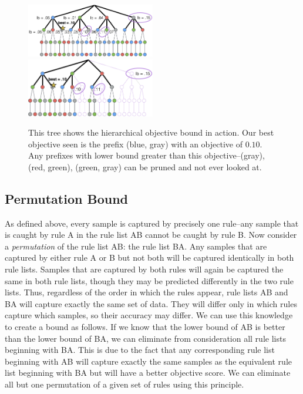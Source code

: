\documentclass[]{report}
\theoremstyle{definition}
\begin{document}
\begin{figure}
\includegraphics[width=0.5\textwidth]{figs/ela_branch-and-bound-tree.png}
\includegraphics[width=0.5\textwidth]{figs/ela_branch-and-bound-tree-pruned.png}
\caption[Objective bound]{This tree shows the hierarchical objective bound in action. Our best objective seen is the prefix (blue, gray) with an objective of $0.10$. Any prefixes with lower bound greater than this objective--(gray), (red, green), (green, gray) can be pruned and not ever looked at.
\label{fig:objective-bound}}
\end{figure}

\subsection{Permutation Bound}

As defined above, every sample is captured by precisely one rule--any sample that is caught by rule A in the rule list AB cannot be caught by rule B. 
Now consider a \textit{permutation} of the rule list AB: the rule list BA.
Any samples that are captured by either rule A or B but not both will be captured identically in both rule lists.
Samples that are captured by both rules will again be captured the same in both rule lists, though they may be predicted differently in the two rule lists.
Thus, regardless of the order in which the rules appear, rule lists AB and BA will capture exactly the same set of data.
They will differ only in which rules capture which samples, so their accuracy may differ. 
We can use this knowledge to create a bound as follows.
If we know that the lower bound of AB is better than the lower bound of BA, we can eliminate from consideration all rule lists beginning with BA.
This is due to the fact that any corresponding rule list beginning with AB will capture exactly the same samples as the equivalent rule list beginning with BA but will have a better objective score.
We can eliminate all but one permutation of a given set of rules using this principle.
\end{document}
